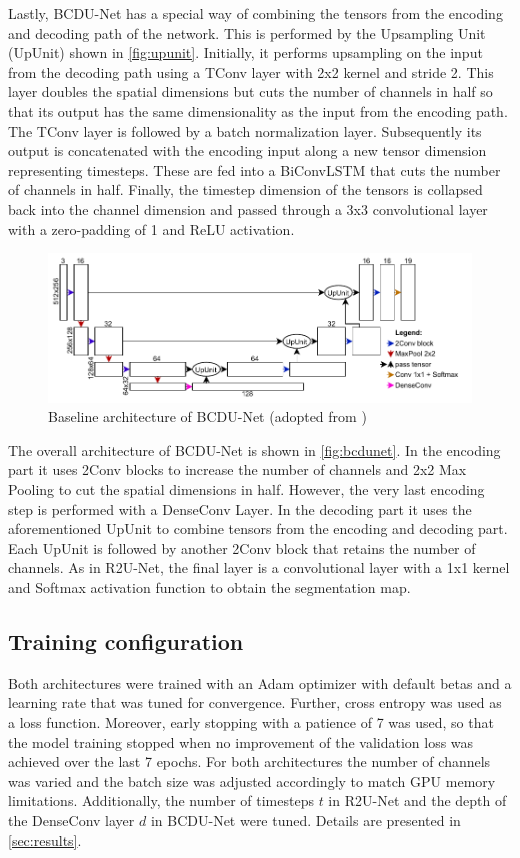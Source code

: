 \documentclass{article}
\begin{document}
Lastly, BCDU-Net has a special way of combining the tensors from the encoding 
and decoding path of the network. This is performed by the Upsampling Unit 
(UpUnit) shown in \autoref{fig:upunit}. Initially, it performs upsampling on 
the input from the decoding path using a TConv layer with 2x2 kernel and stride 
2. This layer doubles the spatial dimensions but cuts the number of channels in 
half so that its output has the same dimensionality as the input from the 
encoding path. The TConv layer is followed by a batch normalization layer. 
Subsequently its output is concatenated with the encoding input along a new 
tensor dimension representing timesteps. These are fed into a BiConvLSTM that 
cuts the number of channels in half. Finally, the timestep dimension of the 
tensors is collapsed back into the channel dimension and passed through a 3x3 
convolutional layer with a zero-padding of 1 and ReLU activation. 
\autocite[3-4]{BCDUNet}

\begin{figure}
	\centering
	\includegraphics[width=\textwidth]{BCDUNet}
	\caption{Baseline architecture of BCDU-Net (adopted from 
		\autocite[4]{BCDUNet})}
	\label{fig:bcdunet}
\end{figure}

The overall architecture of BCDU-Net is shown in \autoref{fig:bcdunet}. In the 
encoding part it uses 2Conv blocks to increase the number of channels and 2x2 
Max Pooling to cut the spatial dimensions in half. However, the very last 
encoding step is performed with a DenseConv Layer. In the decoding part it uses 
the aforementioned UpUnit to combine tensors from the encoding and decoding 
part. Each UpUnit is followed by another 2Conv block that retains the number of 
channels. 
As in R2U-Net, the final layer is a convolutional layer with a 1x1 kernel and 
Softmax activation function to obtain the segmentation map. 
\autocite[3-4]{BCDUNet}

\subsection{Training configuration}
Both architectures were trained with an Adam optimizer \autocite{adam} with 
default betas and a 
learning rate that was tuned for convergence. Further, cross entropy was used 
as a loss function. Moreover, early stopping with a 
patience of 7 was used, so that the model training stopped when no improvement 
of the validation loss was achieved over the last 7 epochs. For both 
architectures the number of channels was varied and the batch size was 
adjusted accordingly to match GPU memory limitations. Additionally, the 
number of timesteps $t$ in R2U-Net and the depth of the DenseConv layer $d$ in 
BCDU-Net were tuned. Details are presented in \autoref{sec:results}.
\end{document}
